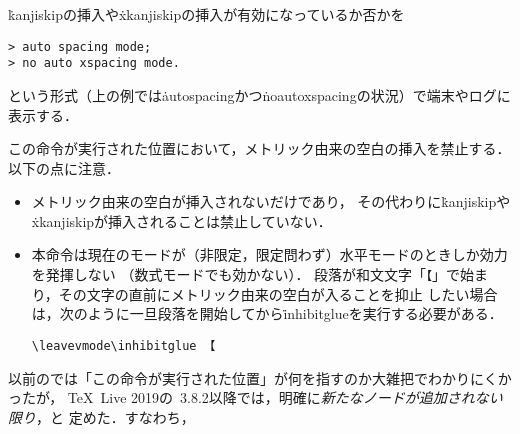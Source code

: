 \documentclass[a4paper,11pt,nomag,dvipdfmx]{jsarticle}
\begin{document}
\begin{cslist}
\csitem[\.{showmode}]
  \.{kanjiskip}の挿入や\.{xkanjiskip}の挿入が有効になっているか否かを
\begin{verbatim}
> auto spacing mode;
> no auto xspacing mode.
\end{verbatim}
  という形式（上の例では\.{autospacing}かつ\.{noautoxspacing}の状況）で端末やログに表示する．

\csitem[\.{inhibitglue}]
  この命令が実行された位置において，メトリック由来の空白の挿入を禁止する．以下の点に注意．
\begin{itemize}
 \item メトリック由来の空白が挿入されないだけであり，
       その代わりに\.{kanjiskip}や\.{xkanjiskip}が挿入されることは禁止していない．
 \item 本命令は現在のモードが（非限定，限定問わず）水平モードのときしか効力を発揮しない
       （数式モードでも効かない）．
       段落が和文文字「\verb|【|」で始まり，その文字の直前にメトリック由来の空白が入ることを抑止
       したい場合は，次のように一旦段落を開始してから\.{inhibitglue}を実行する必要がある．
\begin{verbatim}
\leavevmode\inhibitglue 【
\end{verbatim}
\end{itemize}
  以前の\pTeX では「この命令が実行された位置」が何を指すのか大雑把でわかりにくかったが，
  \TeX~Live 2019の\pTeX~3.8.2以降では，明確に\emph{新たなノードが追加されない限り}，と
  定めた\cite{tjb28,forum_2566}．すなわち，
\end{cslist}
\end{document}
